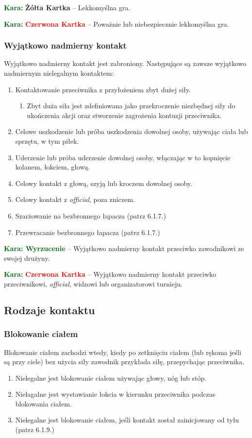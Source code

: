 \documentclass[11pt,a4paper]{article}
\newcommand\redcard[1]{\bgroup\textcolor{darkgreen}{\textbf{Kara: }}\bgroup\textcolor{red}{\textbf{Czerwona Kartka}} -- #1}
\newcommand\yellowcard[1]{\bgroup\textcolor{darkgreen}{\textbf{Kara: }}\bgroup\textcolor{darkyellow}{\textbf{Żółta Kartka}} -- #1}
\newcommand\penaltyd[2]{\bgroup\textcolor{darkgreen}{\textbf{Kara: #1}} -- #2}
\begin{document}
\yellowcard{Lekkomyślna gra.}

\redcard{Poważnie lub niebezpiecznie lekkomyślna gra.}

\subsubsection{Wyjątkowo nadmierny kontakt}
Wyjątkowo nadmierny kontakt jest zabroniony. Następujące są zawsze wyjątkowo nadmiernym nielegalnym kontaktem:
\begin{enumerate}
  \item Kontaktowanie przeciwnika z przyłożeniem zbyt dużej siły.
  \begin{enumerate}
    \item Zbyt duża siła jest zdefiniowana jako przekroczenie niezbędnej siły do ukończenia akcji oraz stworzenie zagrożenia kontuzji przeciwnika.
  \end{enumerate}
  \item Celowe uszkodzenie lub próba uszkodzenia dowolnej osoby, używając ciała lub sprzętu, w tym piłek.
  \item Uderzenie lub próba uderzenie dowolnej osoby, włączając w to kopnięcie kolanem, łokciem, głową.
  \item Celowy kontakt z głową, szyją lub kroczem dowolnej osoby.
  \item Celowy kontakt z \emph{official}, poza zniczem.
  \item Szarżowanie na bezbronnego łapacza (patrz 6.1.7.) %
  \item Przewracanie bezbronnego łapacza (patrz 6.1.7.) %
\end{enumerate}

\penaltyd{Wyrzucenie}{Wyjątkowo nadmierny kontakt przeciwko zawodnikowi ze swojej drużyny.}

\redcard{Wyjątkowo nadmierny kontakt przeciwko przeciwnikowi, \emph{official}, widzowi lub organizatorowi turnieju.}

\subsection{Rodzaje kontaktu}

\subsubsection{Blokowanie ciałem}
Blokowanie ciałem zachodzi wtedy, kiedy po zetknięciu ciałem (lub rękoma jeśli są przy ciele) bez użycia siły zawodnik przykłada siłę, przepychając przeciwnika.
\begin{enumerate}
  \item Nielegalne jest blokowanie ciałem używając głowy, nóg lub stóp.
  \item Nielagalne jest wystawianie łokcia w kierunku przeciwnika podczas blokowania ciałem.
  \item Nielegalne jest blokowanie ciałem, jeśli kontakt został zainicjowany od tyłu (patrz 6.1.9.) %
\end{enumerate}
\end{document}
